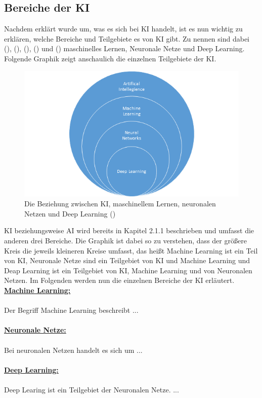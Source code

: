 \documentclass[12pt,toc=bib,toc=listof]{scrreprt}
\begin{document}
\subsection{Bereiche der KI} %
\label{sec:bereicheDerKI}
Nachdem erklärt wurde um, was es sich bei KI handelt, ist es nun wichtig zu erklären, welche Bereiche und Teilgebiete es von KI gibt. Zu nennen sind dabei (\cite{Bhatt2021}), (\cite{Hecker2018}), (\cite{Mocko2021}), (\cite{Roscher2025}) und (\cite{Zhu2021}) maschinelles Lernen, Neuronale Netze und Deep Learning.
Folgende Graphik zeigt anschaulich die einzelnen Teilgebiete der KI.
\begin{figure} [H]
    \centering
    \includegraphics[width=1\linewidth]{./Bilder/Mocko_Die Beziehung zwischen KI, maschinellem Lernen, neuronalen Netzen und Deep Learning.png}
    \caption{Die Beziehung zwischen KI, maschinellem Lernen, neuronalen Netzen und Deep Learning (\cite{Mocko2021})}
    \label{fig:enter-label}
\end{figure}
\noindent KI beziehungsweise AI wird bereits in Kapitel 2.1.1 beschrieben und umfasst die anderen drei Bereiche. Die Graphik ist dabei so zu verstehen, dass der größere Kreis die jeweils kleineren Kreise umfasst, das heißt Machine Learning ist ein Teil von KI, Neuronale Netze sind ein Teilgebiet von KI und Machine Learning und Deap Learning ist ein Teilgebiet von KI, Machine Learning und von Neuronalen Netzen. Im Folgenden werden nun die einzelnen Bereiche der KI erläutert.\\
\newpage
\noindent\textbf{\underline{Machine Learning:}}\\
\\
Der Begriff Machine Learning beschreibt ...\\
\\
\textbf{\underline{Neuronale Netze:}}\\
\\
Bei neuronalen Netzen handelt es sich um ...\\
\\
\textbf{\underline{Deep Learning:}}\\
\\
Deep Learing ist ein Teilgebiet der Neuronalen Netze. ...
\end{document}
